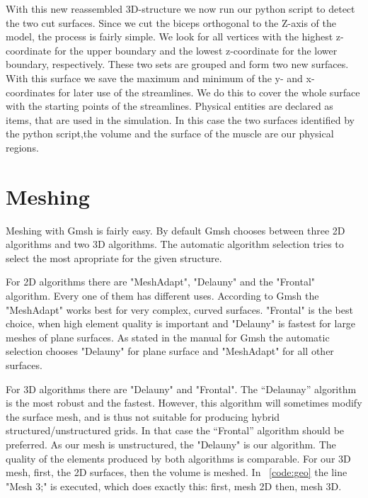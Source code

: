 \documentclass[preprint,journal]{vgtc}       %
\begin{document}
With this new reassembled 3D-structure we now run our python script to detect the two cut surfaces. 
Since we cut the biceps orthogonal to the Z-axis of the model, the process is fairly simple.
We look for all vertices with the highest z-coordinate for the upper boundary and the lowest z-coordinate for the lower boundary, respectively.
These two sets are grouped and form two new surfaces. 
With this surface we save the maximum and minimum of the y- and x- coordinates for later use of the streamlines. 
We do this to cover the whole surface with the starting points of the streamlines.
Physical entities are declared as items, that are used in the simulation. 
In this case the two surfaces identified by the python script,the volume and the surface of the muscle are our physical regions. 

\section{Meshing}
Meshing with Gmsh is fairly easy. 
By default Gmsh chooses between three 2D algorithms and two 3D algorithms.
The automatic algorithm selection tries to select the most apropriate for the given structure.

For 2D algorithms there are "MeshAdapt", "Delauny" and the "Frontal" algorithm.
Every one of them has different uses. 
According to Gmsh the "MeshAdapt" works best for very complex, curved surfaces.
"Frontal" is the best choice, when high element quality is important and "Delauny" is fastest for large meshes of plane surfaces.
As stated in the manual for Gmsh the automatic selection chooses "Delauny" for plane surface and "MeshAdapt" for all other surfaces. 

For 3D algorithms there are "Delauny" and "Frontal". 
The “Delaunay” algorithm is the most robust and the fastest. 
However, this algorithm will sometimes modify the surface mesh, and is thus not suitable for producing hybrid structured/unstructured grids.
In that case the “Frontal” algorithm should be preferred. 
As our mesh is unstructured, the "Delauny" is our algorithm. 
The quality of the elements produced by both algorithms is comparable.
For our 3D mesh, first, the 2D surfaces, then the volume is meshed. 
In ~\ref{code:geo} the line "Mesh 3;" is executed, which does exactly this: first, mesh 2D then, mesh 3D.
%	
\end{document}
